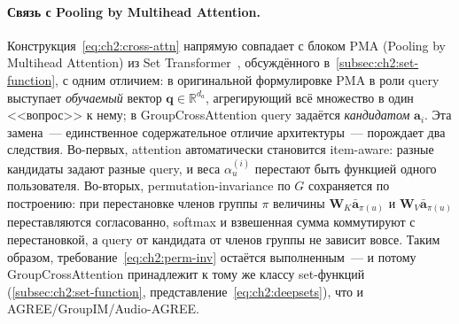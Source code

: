 \paragraph{Связь с Pooling by Multihead Attention.} Конструкция~\eqref{eq:ch2:cross-attn} напрямую совпадает с блоком PMA (Pooling by Multihead Attention) из Set Transformer~\cite{lee2019settransformer}, обсуждённого в~\ref{subsec:ch2:set-function}, с одним отличием: в оригинальной формулировке PMA в роли query выступает \emph{обучаемый} вектор $\mathbf{q} \in \mathbb{R}^{d_a}$, агрегирующий всё множество в один <<вопрос>> к нему; в GroupCrossAttention query задаётся \emph{кандидатом} $\mathbf{a}_i$. Эта замена~--- единственное содержательное отличие архитектуры~--- порождает два следствия. Во-первых, attention автоматически становится item-aware: разные кандидаты задают разные query, и веса $\alpha_u^{(i)}$ перестают быть функцией одного пользователя. Во-вторых, permutation-invariance по $G$ сохраняется по построению: при перестановке членов группы $\pi$ величины $\mathbf{W}_K \bar{\mathbf{a}}_{\pi(u)}$ и $\mathbf{W}_V \bar{\mathbf{a}}_{\pi(u)}$ переставляются согласованно, softmax и взвешенная сумма коммутируют с перестановкой, а query от кандидата от членов группы не зависит вовсе. Таким образом, требование~\eqref{eq:ch2:perm-inv} остаётся выполненным~--- и потому GroupCrossAttention принадлежит к тому же классу set-функций (\ref{subsec:ch2:set-function}, представление~\eqref{eq:ch2:deepsets}), что и AGREE/GroupIM/Audio-AGREE.

